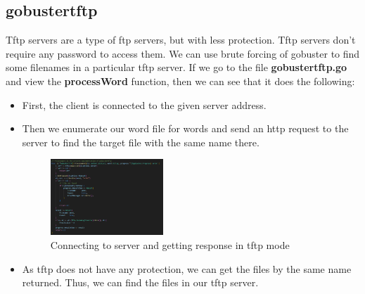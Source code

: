 \documentclass[12 pt]{article}
\begin{document}
\subsection{gobustertftp}
Tftp servers are a type of ftp servers, but with less protection. Tftp servers don’t require any password to access them. We can use brute forcing of gobuster to find some filenames in a particular tftp server. If we go to the file \textbf{gobustertftp.go} and view the \textbf{processWord} function, then we can see that it does the following:
\begin{itemize}
    \item First, the client is connected to the given server address.
    \item Then we enumerate our word file for words and send an http request to the server to find the target file with the same name there.
    \begin{figure}[!htbp]
        \centering
        \includegraphics[width=0.4\textwidth]{Gobustertftp_processWord.png}
        \caption{Connecting to server and getting response in tftp mode}
        \label{fig: Gobustertftp processWord}
    \end{figure}
    \item As tftp does not have any protection, we can get the files by the same name returned. Thus, we can find the files in our tftp server.
\end{itemize}
\end{document}
